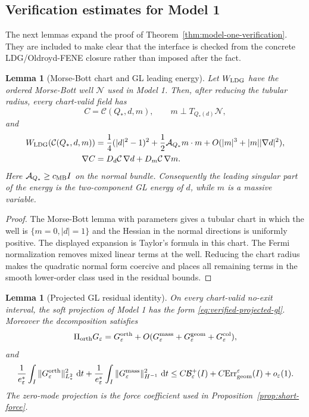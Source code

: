 \documentclass[11pt]{article}
\newtheorem{lemma}[theorem]{Lemma}
\theoremstyle{definition}
\newcommand{\dd}{\,\mathrm d}
\newcommand{\eps}{\varepsilon}
\newcommand{\estar}{e_\varepsilon^\ast}
\newcommand{\Basin}{\mathcal B}
\begin{document}
\subsection{Verification estimates for Model 1}
\label{subsec:app-model-one-verification}

The next lemmas expand the proof of Theorem~\ref{thm:model-one-verification}.
They are included to make clear that the interface is checked from the concrete
LDG/Oldroyd-FENE closure rather than imposed after the fact.

\begin{lemma}[Morse-Bott chart and GL leading energy]
\label{lem:app-mb-chart-verification}
Let \(W_{\rm LDG}\) have the ordered Morse-Bott well \(\mathcal N\) used in
Model 1.  Then, after reducing the tubular radius, every chart-valid field has
\[
        C=\mathcal C(Q_\ast,d,m),\qquad
        m\perp T_{Q_\ast(d)}\mathcal N,
\]
and
\[
\begin{aligned}
        W_{\rm LDG}(\mathcal C(Q_\ast,d,m))
        &=\frac14(|d|^2-1)^2+\frac12\mathcal A_{Q_\ast}m\cdot m
        +O(|m|^3+|m||\nabla d|^2),\\
        \nabla C
        &=D_d\mathcal C\,\nabla d+D_m\mathcal C\,\nabla m .
\end{aligned}
\]
Here \(\mathcal A_{Q_\ast}\ge c_{\rm MB}I\) on the normal bundle.  Consequently
the leading singular part of the energy is the two-component GL energy of
\(d\), while \(m\) is a massive variable.
\end{lemma}

\begin{proof}
The Morse-Bott lemma with parameters gives a tubular chart in which the well is
\(\{m=0, |d|=1\}\) and the Hessian in the normal directions is uniformly
positive.  The displayed expansion is Taylor's formula in this chart.  The
Fermi normalization removes mixed linear terms at the well.  Reducing the chart
radius makes the quadratic normal form coercive and places all remaining terms
in the smooth lower-order class used in the residual bounds.
\end{proof}

\begin{lemma}[Projected GL residual identity]
\label{lem:app-projected-gl-identity}
On every chart-valid no-exit interval, the soft projection of Model 1 has the
form \eqref{eq:verified-projected-gl}.  Moreover the decomposition satisfies
\[
        \Pi_{\rm orth}G_\eps
        =G_\eps^{\rm orth}+O(G_\eps^{\rm mass}+G_\eps^{\rm geom}+G_\eps^{\rm col}),
\]
and
\[
        \frac1{\estar}\int_I\|G_\eps^{\rm orth}\|_{L^2_\ast}^2\,\dd t
        +\frac1{\estar}\int_I\|G_\eps^{\rm mass}\|_{H^{-1}}^2\,\dd t
        \le C\Basin_\eps^+(I)+C{\rm Err}_{\rm geom}^\eps(I)+o_\eps(1).
\]
The zero-mode projection is the force coefficient used in
Proposition~\ref{prop:short-force}.
\end{lemma}
\end{document}
